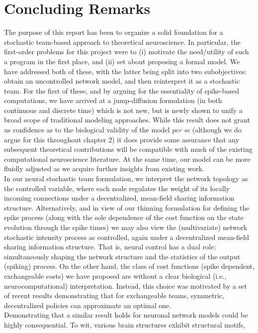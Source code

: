 \documentclass[12pt, oneside]{report}
\newcommand{\1}[1]{\mathbbm{1}_{\{#1\}}}
\theoremstyle{definition}
\begin{document}
\chapter{Concluding Remarks}
The purpose of this report has been to organize a solid foundation for a
stochastic team-based approach to theoretical neuroscience. In particular, the
first-order problems for this project were to (i) motivate the need/utility of
such a program in the first place, and (ii) set about proposing a formal model.
We have addressed both of these, with the latter being split into two
subobjectives: obtain an uncontrolled network model, and then reinterpret it as
a stochastic team. For the first of these, and by arguing for the essentiality of
spike-based computations, we have arrived at a jump-diffusion formulation (in
both continuous and discrete time) which is not new, but is newly shown to unify
a broad scope of traditional modeling approaches. While this result does not
grant us confidence as to the biological validity of the model \textit{per se}
(although we do argue for this throughout chapter 2) it does provide some
assurance that any subsequent theoretical contributions will be compatible with
much of the existing computational neuroscience literature. At the same time, our model
can be more fluidly adjusted as we acquire further insights from existing work.\\[5pt]
\indent In our neural stochastic team formulation, we interpret the network topology
as the controlled variable, where each node regulates the weight of its locally incoming connections
under a decentralized, mean-field sharing information structure. Alternatively, and in view of our thinning formulation for defining the spike
process (along with the sole dependence of the cost function on the state evolution through the spike times) we may also
view the (multivariate) network stochastic intensity process as controlled, again under a decentralized mean-field sharing information structure.
That is, neural control has a dual role; simultaneously shaping the network structure and the statistics of the output (spiking) process.
On the other hand, the class of cost functions (spike dependent, exchangeable costs) we have proposed are without a clear biological (i.e., neurocomputational) interpretation. 
Instead, this choice was motivated by a set of recent results demonstrating that for exchangeable teams, symmetric, decentralized policies can approximate
an optimal one.\\[5pt]
\indent Demonstrating that a similar result holds for neuronal network models could be highly consequential. To wit, various brain structures exhibit structural motifs,
\end{document}

